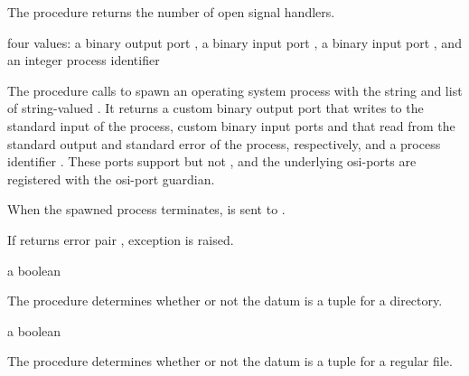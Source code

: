 The  procedure returns the number of open
signal handlers.

\begin{procedure}
\end{procedure}
\returns{} four values: a binary output port , a binary
input port , a binary input port ,
and an integer process identifier 

The  procedure calls  to spawn
an operating system process with the string  and list of
string-valued . It returns a custom binary output port
 that writes to the standard input of the process,
custom binary input ports  and  that
read from the standard output and standard error of the process,
respectively, and a process identifier . These ports
support  but not , and
the underlying osi-ports are registered with the osi-port
guardian.

When the spawned process terminates,  is sent to
.

If  returns error pair , exception  is raised.

\begin{procedure}
\end{procedure}
\returns{} a boolean

The  procedure determines whether or not the
datum  is a  tuple for a directory.

\begin{procedure}
\end{procedure}
\returns{} a boolean

The  procedure determines whether or not the
datum  is a  tuple for a regular file.

